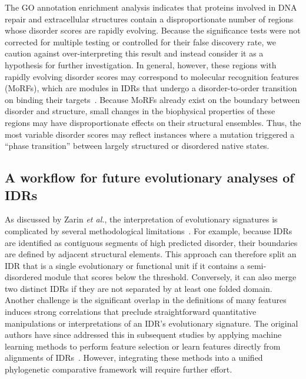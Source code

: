 The GO annotation enrichment analysis indicates that proteins involved in DNA repair and extracellular structures contain a disproportionate number of regions whose disorder scores are rapidly evolving. Because the significance tests were not corrected for multiple testing or controlled for their false discovery rate, we caution against over-interpreting this result and instead consider it as a hypothesis for further investigation. In general, however, these regions with rapidly evolving disorder scores may correspond to molecular recognition features (MoRFs), which are modules in IDRs that undergo a disorder-to-order transition on binding their targets~\cite{vanderLee2014}. Because MoRFs already exist on the boundary between disorder and structure, small changes in the biophysical properties of these regions may have disproportionate effects on their structural ensembles. Thus, the most variable disorder scores may reflect instances where a mutation triggered a ``phase transition'' between largely structured or disordered native states.

\subsection{A workflow for future evolutionary analyses of IDRs}
As discussed by Zarin \textit{et al.}, the interpretation of evolutionary signatures is complicated by several methodological limitations~\cite{Zarin2019}. For example, because IDRs are identified as contiguous segments of high predicted disorder, their boundaries are defined by adjacent structural elements. This approach can therefore split an IDR that is a single evolutionary or functional unit if it contains a semi-disordered module that scores below the threshold. Conversely, it can also merge two distinct IDRs if they are not separated by at least one folded domain. Another challenge is the significant overlap in the definitions of many features induces strong correlations that preclude straightforward quantitative manipulations or interpretations of an IDR's evolutionary signature. The original authors have since addressed this in subsequent studies by applying machine learning methods to perform feature selection or learn features directly from alignments of IDRs~\cite{Zarin2021, Lu2022}. However, integrating these methods into a unified phylogenetic comparative framework will require further effort.

